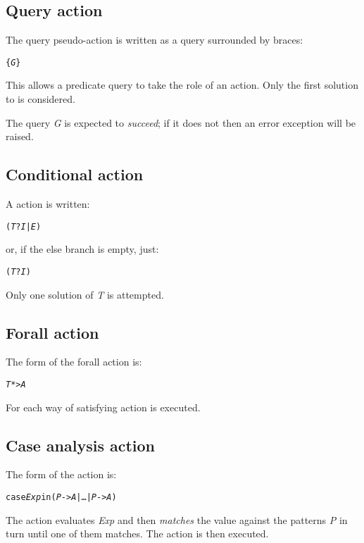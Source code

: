 \subsection{Query action}
\label{action:goal}

\index{\pling\xspace{}operator}
The query pseudo-action is written as a query surrounded by braces:
\begin{alltt}
\{ \emph{G} \}
\end{alltt}
This allows a predicate query to take the role of an action.  Only the first solution to  is considered.

\begin{aside}
The query \emph{G} is expected to \emph{succeed}; if it does not then an  error exception will be raised.
\end{aside}

\subsection{Conditional action}
\label{action:conditional}
A  action is written:
\begin{alltt}
(\emph{T}?\emph{I}|\emph{E})
\end{alltt}
or, if the else branch is empty, just:
\begin{alltt}
(\emph{T}?\emph{I})
\end{alltt}
Only one solution of \emph{T} is attempted.

\subsection{Forall action}
\label{action:forall}
The form of the forall action is:
\begin{alltt}
\emph{T}*>\emph{A}
\end{alltt}
For each way of satisfying  action  is executed.

\subsection{Case analysis action}
\label{action:case}
The form of the  action is:
\begin{alltt}
case \emph{Exp} in (\emph{P} -> \emph{A} | \ldots| \emph{P\subn} -> \emph{A\subn})
\end{alltt}
The  action evaluates \emph{Exp} and then \emph{matches} the value against the patterns \emph{P\subi} in turn until one of them matches. The action  is then executed.


